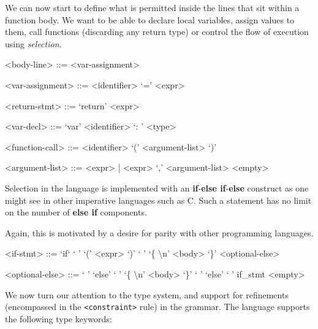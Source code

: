 \documentclass[a4paper,openany,12pt]{book}
\begin{document}
We can now start to define what is permitted inside the lines that sit within a function body.
We want to be able to declare local variables, assign values to them, call functions (discarding any return type) or
control the flow of execution using \emph{selection}.

\begin{grammar}
    <body-line> ::= <var-assignment>

    <var-assignment> ::= <identifier> `=' <expr>

    <return-stmt> ::= `return' <expr>

    <var-decl> ::= `var' <identifier> `: ' <type>

    <function-call> ::= <identifier> `(' <argument-list> `)'

    <argument-list> ::= <expr> | <expr> `,' <argument-list>
    \alt <empty>
\end{grammar}

Selection in the language is implemented with an \textbf{if}-\textbf{else if}-\textbf{else} construct
as one might see in other imperative languages such as C.
Such a statement has no limit on the number of \textbf{else if} components.

Again, this is motivated by a desire for parity with other programming languages.

\begin{grammar}
    <if-stmt> ::= `if` ` ' `(' <expr> `)' ` ' `\{ \textbackslash n' <body> `\}' <optional-else>

    <optional-else> ::= ` ' `else' ` ' `\{ \textbackslash n' <body> `\}' \alt ` ' `else' ` ' if_stmt \alt <empty>

\end{grammar}

We now turn our attention to the type system, and support for refinements (encompassed in the \texttt{<constraint>} rule) in the grammar.
The language supports the following type keywords:
\end{document}
